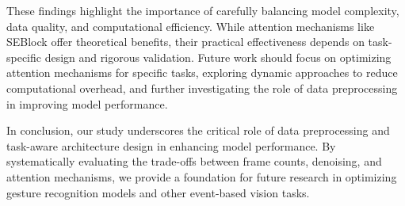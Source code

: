 \documentclass[conference]{IEEEtran}
\begin{document}
These findings highlight the importance of carefully balancing model complexity, data quality, and computational efficiency. While attention mechanisms like SEBlock offer theoretical benefits, their practical effectiveness depends on task-specific design and rigorous validation. Future work should focus on optimizing attention mechanisms for specific tasks, exploring dynamic approaches to reduce computational overhead, and further investigating the role of data preprocessing in improving model performance.

In conclusion, our study underscores the critical role of data preprocessing and task-aware architecture design in enhancing model performance. By systematically evaluating the trade-offs between frame counts, denoising, and attention mechanisms, we provide a foundation for future research in optimizing gesture recognition models and other event-based vision tasks.

\end{document}
